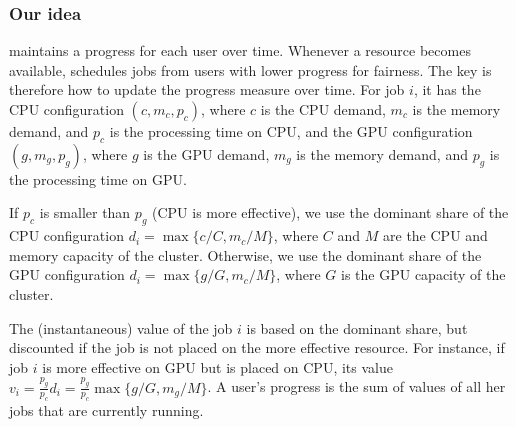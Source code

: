 
\subsubsection{Our idea}
\label{sec:fairness_score}

\name maintains a progress for each user over time. Whenever a resource becomes available, \name schedules jobs from users with lower progress for fairness. The key is therefore how to update the progress measure over time.  
For job $i$, it has the CPU configuration $(c, m_c, p_c)$, where $c$ is the CPU demand, $m_c$ is the memory demand, and $p_c$ is the processing time on CPU, and the GPU configuration $(g, m_g, p_g)$, where $g$ is the GPU demand, $m_g$ is the memory demand, and $p_g$ is the processing time on GPU. 

If $p_c$ is smaller than $p_g$ (CPU is more effective), we use the dominant share of the CPU configuration $d_i=\max\{c/C, m_c/M\}$, where $C$ and $M$ are the CPU and memory capacity of the cluster. 
Otherwise, we use the dominant share of the GPU configuration $d_i=\max\{g/G, m_c/M\}$, where $G$ is the GPU capacity of the cluster. 

The (instantaneous) value of the job $i$ is based on the dominant share, but discounted if the job is not placed on the more effective resource. For instance, if job $i$ is more effective on GPU but is placed on CPU, its value $v_i = \frac{p_g}{p_c} d_i = \frac{p_g}{p_c} \max\{g/G, m_g/M\}$. A user's progress is the sum of values of all her jobs that are currently running.


